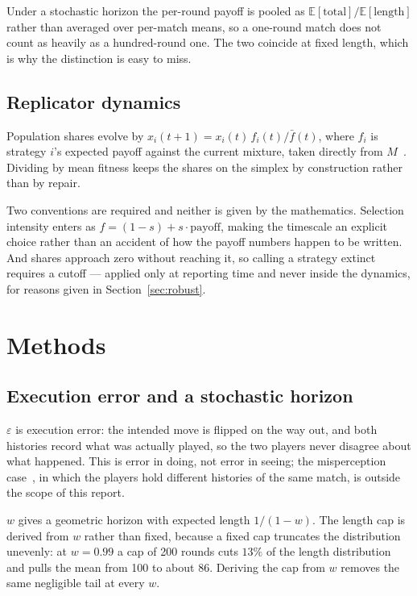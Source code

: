 \documentclass[11pt,a4paper]{article}
\newcommand{\eps}{\varepsilon}
\begin{document}
Under a stochastic horizon the per-round payoff is pooled as
$\mathbb{E}[\text{total}]/\mathbb{E}[\text{length}]$ rather than averaged over
per-match means, so a one-round match does not count as heavily as a
hundred-round one. The two coincide at fixed length, which is why the
distinction is easy to miss.

\subsection{Replicator dynamics}
\label{sec:replicator}

Population shares evolve by $x_i(t+1) = x_i(t)\, f_i(t) / \bar{f}(t)$, where
$f_i$ is strategy $i$'s expected payoff against the current mixture, taken
directly from $M$~\cite{taylor1978,maynardsmith1982}. Dividing by mean fitness
keeps the shares on the simplex by construction rather than by repair.

Two conventions are required and neither is given by the mathematics. Selection
intensity enters as $f = (1-s) + s \cdot \text{payoff}$, making the timescale an
explicit choice rather than an accident of how the payoff numbers happen to be
written. And shares approach zero without reaching it, so calling a strategy
extinct requires a cutoff --- applied only at reporting time and never inside
the dynamics, for reasons given in Section~\ref{sec:robust}.

\section{Methods}
\label{sec:methods}

\subsection{Execution error and a stochastic horizon}
\label{sec:phasec-params}

$\eps$ is execution error: the intended move is flipped on the way out, and both
histories record what was actually played, so the two players never disagree
about what happened. This is error in doing, not error in seeing; the
misperception case~\cite{wu1995}, in which the players hold different histories
of the same match, is outside the scope of this report.

$w$ gives a geometric horizon with expected length $1/(1-w)$. The length cap is
derived from $w$ rather than fixed, because a fixed cap truncates the
distribution unevenly: at $w = 0.99$ a cap of 200 rounds cuts $13\%$ of the
length distribution and pulls the mean from 100 to about 86. Deriving the cap
from $w$ removes the same negligible tail at every $w$.
\end{document}
